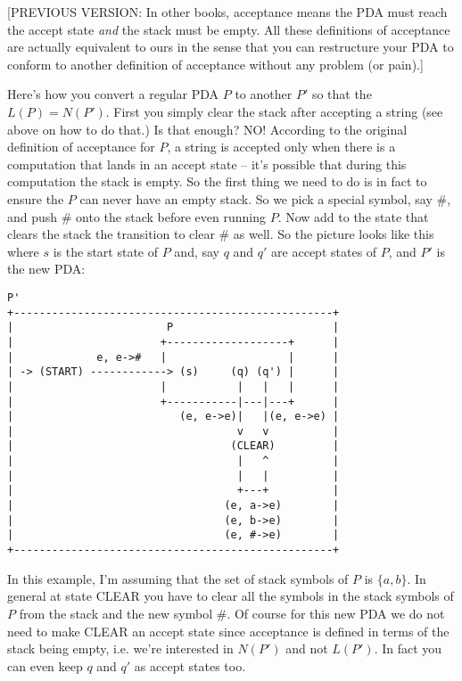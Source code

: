 [PREVIOUS
VERSION: 
In other books, acceptance means the PDA must reach the accept state
\textit{ and} the stack must be empty.
All these definitions of acceptance are actually equivalent to ours
in the sense that you can restructure your PDA to conform to another definition
of acceptance without any problem (or pain).]


Here's how you convert a regular PDA $P$ to another $P'$ so that the 
$L(P) = N(P')$.
First you simply clear the stack after accepting a string (see above on how to
do that.)
Is that enough?
NO! According to the original definition of acceptance for $P$,
a string is accepted only when there is a computation that lands in an accept 
state -- it's possible that during this computation the stack is empty.
So the first thing we need to do is in fact to ensure the $P$ can never
have an empty stack.
So we pick a special symbol, say \#, and push \# onto the stack before even
running $P$. Now add to the state that clears the stack the transition
to clear \# as well.
So the picture looks like this where $s$ is the start state of $P$ and,
say $q$ and $q'$ are accept states of $P$, and $P'$ is the new PDA:

\begin{samepage}
\begin{verbatim}
P'
+--------------------------------------------------+
|                        P                         |
|                       +-------------------+      |
|             e, e->#   |                   |      |
| -> (START) ------------> (s)     (q) (q') |      |
|                       |           |   |   |      |
|                       +-----------|---|---+      |
|                          (e, e->e)|   |(e, e->e) |
|                                   v   v          |
|                                  (CLEAR)         |
|                                   |   ^          |
|                                   |   |          |
|                                   +---+          |
|                                 (e, a->e)        |
|                                 (e, b->e)        |
|                                 (e, #->e)        |
+--------------------------------------------------+
\end{verbatim}
\end{samepage}

In this example, I'm assuming that the set of stack symbols of $P$ is
$\{a, b\}$.
In general at state CLEAR you have to clear all the symbols in the stack
symbols of $P$ from the stack and the new symbol \#.
Of course for this new PDA we do not need to make CLEAR an accept state since
acceptance is defined in terms of the stack being empty, i.e. we're
interested in $N(P')$ and not $L(P')$.
In fact you can even keep $q$ and $q'$ as accept states too.

